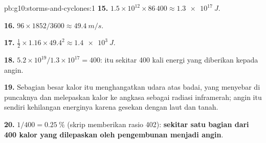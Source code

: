 \begin{solution}{pb:g10:storms-and-cyclones:1}
\textbf{15.} $1.5\times10^{12} \times 86\,400 \approx \qty{1.3e17}{J}$.

\textbf{16.} $96 \times 1852/3600 \approx \qty{49.4}{m/s}$.

\textbf{17.} $\frac12 \times 1.16 \times 49.4^2 \approx \qty{1.4e3}{J}$.

\textbf{18.} $5.2\times10^{19}/1.3\times10^{17} = 400$:  itu
sekitar 400 kali energi yang diberikan kepada angin.

\textbf{19.} Sebagian besar kalor itu menghangatkan udara atas badai, yang
menyebar di puncaknya dan melepaskan kalor ke angkasa sebagai radiasi
inframerah; angin itu sendiri kehilangan energinya karena gesekan dengan laut
dan tanah.

\textbf{20.} $1/400 = \qty{0.25}{\percent}$ (skrip memberikan rasio
402): \textbf{sekitar satu bagian dari 400 kalor yang dilepaskan oleh
pengembunan menjadi angin}.
\end{solution}
